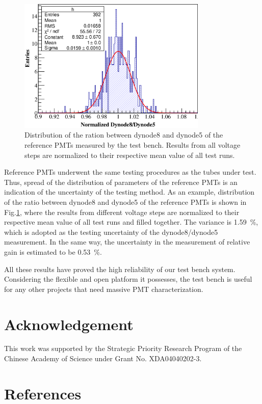 \documentclass[preprint, times]{elsarticle}
\begin{document}
\begin{figure}
 \centering
 \includegraphics[width=90mm]{FIG14}
\caption{Distribution of the ration between dynode8 and dynode5 of the reference PMTs measured by the test bench.
Results from all voltage steps are normalized to their respective mean value of all test runs.}
\label{fig:FIG14}
\end{figure} 

Reference PMTs underwent the same testing procedures as the tubes under test.
Thus, spread of the distribution of parameters of the reference PMTs is an indication of the uncertainty of the testing method.
As an example, distribution of the ratio between dynode8 and dynode5 of the reference PMTs is shown in Fig.\ref{fig:FIG14}, where the results from different voltage steps are normalized to their respective mean value of all test runs and filled together.
The variance is \SI{1.59}{\percent}, which is adopted as the testing uncertainty of the dynode8/dynode5 measurement.
In the same way, the uncertainty in the measurement of relative gain is estimated to be \SI{0.53}{\percent}. 

All these results have proved the high reliability of our test bench system.
Considering the flexible and open platform it possesses, the test bench is useful for any other projects that need massive PMT characterization. 

\section*{Acknowledgement}
\label{sec:acknowledgement}

This work was supported by the Strategic Priority Research Program of the Chinese Academy of Science under Grant No. XDA04040202-3.


\section*{References}
\label{sec:reference}



\end{document}
